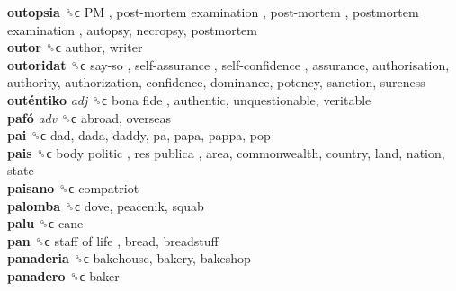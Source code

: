 \textbf{outopsia} ␝ϲ   PM ,  post-mortem examination ,  post-mortem ,  postmortem examination , autopsy, necropsy, postmortem  \\
\textbf{outor} ␝ϲ  author, writer  \\
\textbf{outoridat} ␝ϲ   say-so ,  self-assurance ,  self-confidence , assurance, authorisation, authority, authorization, confidence, dominance, potency, sanction, sureness  \\
\textbf{outéntiko} \emph{adj}  ␝ϲ   bona fide , authentic, unquestionable, veritable  \\
\textbf{pafó} \emph{adv}  ␝ϲ  abroad, overseas  \\
\textbf{pai} ␝ϲ  dad, dada, daddy, pa, papa, pappa, pop  \\
\textbf{pais} ␝ϲ   body politic ,  res publica , area, commonwealth, country, land, nation, state  \\
\textbf{paisano} ␝ϲ  compatriot  \\
\textbf{palomba} ␝ϲ  dove, peacenik, squab  \\
\textbf{palu} ␝ϲ  cane  \\
\textbf{pan} ␝ϲ   staff of life , bread, breadstuff  \\
\textbf{panaderia} ␝ϲ  bakehouse, bakery, bakeshop  \\
\textbf{panadero} ␝ϲ  baker  \\
